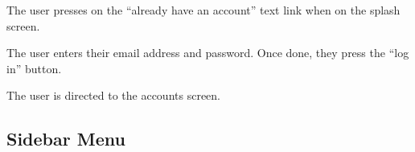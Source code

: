 \begin{minipage}{\textwidth}
  \centering
  \begin{minipage}[t]{4.6cm}
    \vspace{0pt}
    \centering
    \begin{minipage}{4.4cm}
      The user presses on the ``already have an account'' text link when on the splash screen.
    \end{minipage}
  \end{minipage}
  \begin{minipage}[t]{4.6cm}
    \vspace{0pt}
    \centering
    \begin{minipage}{4.4cm}
      The user enters their email address and password. Once done, they press the ``log in'' button.
    \end{minipage}
  \end{minipage}
  \begin{minipage}[t]{4.6cm}
    \vspace{0pt}
    \centering
    \begin{minipage}{4.4cm}
      The user is directed to the accounts screen.
    \end{minipage}
  \end{minipage}
\end{minipage}

\subsection{Sidebar Menu}


